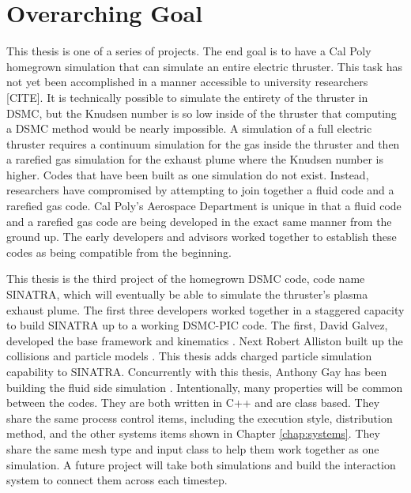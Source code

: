 




\section{Overarching Goal}
This thesis is one of a series of projects. The end goal is to have a Cal Poly homegrown simulation that can simulate an entire electric thruster. This task has not yet been accomplished in a manner accessible to university researchers [CITE]. It is technically possible to simulate the entirety of the thruster in DSMC, but the Knudsen number is so low inside of the thruster that computing a DSMC method would be nearly impossible. A simulation of a full electric thruster requires a continuum simulation for the gas inside the thruster and then a rarefied gas simulation for the exhaust plume where the Knudsen number is higher. Codes that have been built as one simulation do not exist. Instead, researchers have compromised by attempting to join together a fluid code and a rarefied gas code. Cal Poly's Aerospace Department is unique in that a fluid code and a rarefied gas code are being developed in the exact same manner from the ground up. The early developers and advisors worked together to establish these codes as being compatible from the beginning. \par

\indent This thesis is the third project of the homegrown DSMC code, code name SINATRA, which will eventually be able to simulate the thruster’s plasma exhaust plume. The first three developers worked together in a staggered capacity to build SINATRA up to a working DSMC-PIC code. The first, David Galvez, developed the base framework and kinematics \cite{Galvez2018a}. Next Robert Alliston built up the collisions and particle models \cite{mac_thesis}. This thesis adds charged particle simulation capability to SINATRA. Concurrently with this thesis, Anthony Gay has been building the fluid side simulation \cite{Gay}. Intentionally, many properties will be common between the codes. They are both written in C++ and are class based. They share the same process control items, including the execution style, distribution method, and the other systems items shown in Chapter \ref{chap:systems}. They share the same mesh type and input class to help them work together as one simulation. A future project will take both simulations and build the interaction system to connect them across each timestep.
